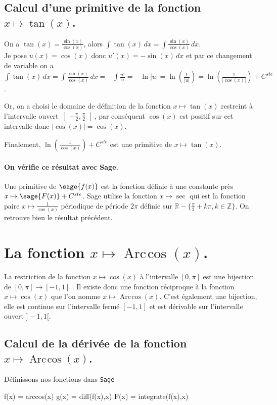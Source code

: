 \documentclass[a4paper,12pt]{report}
\def\eclaire{\mathbb}
\def\R{\ensuremath{\eclaire R}}
\def\Z{\ensuremath{\eclaire Z}}
\renewcommand{\arccos}{\mathop{\mathrm{Arc\mspace{2mu}cos}}}
\begin{document}
\subsection{Calcul d'une primitive de la fonction  $x \mapsto \tan(x)$.}
On a $\tan(x)=\frac{\sin(x)}{\cos(x)}$, alors $\int \tan(x) \, dx =\int \frac{\sin(x)}{\cos(x)}\, dx$.\\
Je pose $u(x)=\cos(x)$ donc $u'(x)= -\sin(x) \,dx$ et par ce changement de variable on a $\int \tan(x) \, dx = \int \frac{\sin(x)}{\cos(x)}\, dx  = -\int \frac{u'}{u} = -\ln|u|  = \ln\left(\frac{1}{|u|}\right)  = \ln\left(\frac{1}{|\cos(x)|}\right) +C^{ste}$.

Or, on a choisi le domaine de définition de la fonction $x \mapsto \tan(x)$ restreint à l'intervalle ouvert $ \left] -\frac{\pi}{ 2} , \frac{\pi}{ 2} \right[ $, par conséquent $\cos(x)$ est positif sur cet intervalle donc $|\cos(x)| = \cos(x)$.

Finalement, $ \ln\left(\frac{1}{\cos(x)}\right) +C^{ste}$ est une primitive de $x \mapsto \tan(x)$.
\paragraph{On vérifie ce résultat avec Sage.}
Une primitive de $\sage{f(x)}$ est la fonction définie à une constante près $x \mapsto \sage{F(x)} + C^{ste} $.
Sage utilise la fonction $x\mapsto \sec$ qui est la fonction paire $x\mapsto \frac{1}{\cos(x)}$ périodique de période $2\pi$ définie sur $\R-\{ \frac{\pi}{2}+k\pi, k\in\Z\}$. On retrouve bien le résultat précédent.


\section{La fonction  $x \mapsto \arccos(x) $.}
La restriction de la fonction $x \mapsto \cos(x) $ à l'intervalle $[0,\pi]$ est une bijection de $[0,\pi] \rightarrow [-1,1]$ . Il existe donc une fonction réciproque à la fonction $x \mapsto \cos(x) $ que l'on nomme $x \mapsto \arccos(x) $. C'est également une bijection, elle est continue sur l'intervalle fermé  $ [-1,1]$ et est dérivable sur l'intervalle ouvert $]-1,1[$.

\subsection{Calcul de la dérivée de la fonction $x \mapsto \arccos(x) $.}
Définissons nos fonctions dans {\texttt{Sage}}
\begin{sageblock}
    f(x) = arccos(x)
    g(x) = diff(f(x),x)
    F(x) = integrate(f(x),x)
\end{sageblock}
\end{document}
